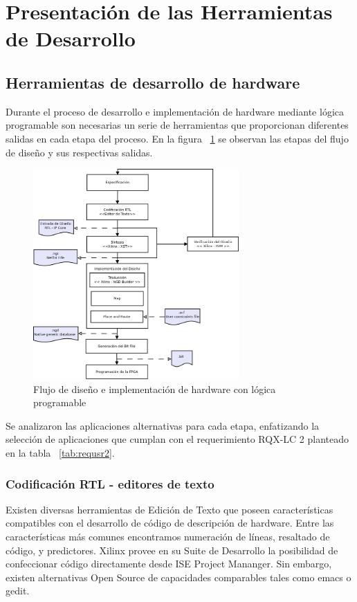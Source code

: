  		\section{Presentación de las Herramientas de Desarrollo} 	 
 				\subsection {Herramientas de desarrollo de hardware}
 				Durante el proceso de desarrollo e implementación de hardware mediante lógica programable son necesarias un serie de herramientas que
 				proporcionan diferentes salidas en cada etapa del proceso. En la figura ~\ref{fig:designflow} se observan las etapas del flujo de diseño y sus
 				respectivas salidas.
 				
 		\begin{figure}[h!]
 		\begin{center}
  		\includegraphics[width=0.7\textwidth,keepaspectratio=true]{./images/designflow}
  		\caption{Flujo de diseño e implementación de hardware con lógica programable}
  		\label{fig:designflow}
 		\end{center}
		\end{figure}
		
				Se analizaron las aplicaciones alternativas para cada etapa, enfatizando la selección de aplicaciones que cumplan con el requerimiento RQX-LC 2
				planteado en la tabla ~\ref{tab:requsr2}.   
				
				\subsubsection {Codificación RTL - editores de texto}
				Existen diversas herramientas de Edición de Texto que poseen características compatibles con el desarrollo de código de descripción de hardware.
				Entre las características más comunes encontramos numeración de líneas, resaltado de código, y predictores. 
				Xilinx provee en su Suite de Desarrollo la posibilidad de confeccionar código directamente desde ISE Project Mananger. Sin embargo,
				existen alternativas Open Source de capacidades comparables tales como emacs o gedit. 
				
